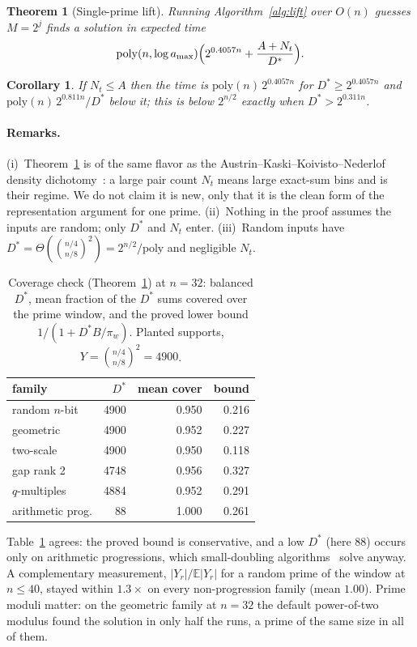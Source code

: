 \documentclass[conference]{IEEEtran}
\newtheorem{theorem}{Theorem}
\newtheorem{corollary}{Corollary}
\begin{document}
\begin{theorem}[Single-prime lift]\label{thm:lift}
Running Algorithm~\ref{alg:lift} over $O(n)$ guesses $M=2^j$ finds a solution in
expected time
\[
\mathrm{poly}(n,\log a_{\max})\Bigl(2^{0.4057n}+\frac{A+N_t}{D^*}\Bigr).
\]
\end{theorem}

\begin{corollary}\label{cor:lift}
If $N_t\le A$ then the time is $\mathrm{poly}(n)\,2^{0.4057n}$ for
$D^*\ge 2^{0.4057n}$ and $\mathrm{poly}(n)\,2^{0.811n}/D^*$ below it; this is below
$2^{n/2}$ exactly when $D^*>2^{0.311n}$.
\end{corollary}

\paragraph*{Remarks.}
(i)~Theorem~\ref{thm:lift} is of the same flavor as the Austrin--Kaski--Koivisto--Nederlof
density dichotomy~\cite{akkn}: a large pair count $N_t$ means large exact-sum bins
and is their regime. We do not claim it is new, only that it is the clean form of
the representation argument for one prime. (ii)~Nothing in the proof assumes the
inputs are random; only $D^*$ and $N_t$ enter. (iii)~Random inputs have
$D^*=\Theta(\binom{n/4}{n/8}^2)=2^{n/2}/\mathrm{poly}$ and negligible $N_t$.

\begin{table}[t]
\centering
\caption{Coverage check (Theorem~\ref{thm:lift}) at $n=32$: balanced
$D^*$, mean fraction of the $D^*$ sums covered over the prime window, and the proved
lower bound $1/(1+D^*B/\pi_w)$. Planted supports, $Y=\binom{n/4}{n/8}^2=4900$.}
\label{tab:lift}
\begin{tabular}{lrrr}
\toprule
family & $D^*$ & mean cover & bound\\
\midrule
random $n$-bit & 4900 & 0.950 & 0.216\\
geometric & 4900 & 0.952 & 0.227\\
two-scale & 4900 & 0.950 & 0.118\\
gap rank 2 & 4748 & 0.956 & 0.327\\
$q$-multiples & 4884 & 0.952 & 0.291\\
arithmetic prog. & 88 & 1.000 & 0.261\\
\bottomrule
\end{tabular}
\end{table}

Table~\ref{tab:lift} agrees: the proved bound is conservative, and a low $D^*$
(here $88$) occurs only on arithmetic progressions, which small-doubling
algorithms~\cite{rwdoubling} solve anyway. A complementary measurement,
$|Y_r|/\mathbb E|Y_r|$ for a random prime of the window at $n\le40$, stayed within
$1.3\times$ on every non-progression family (mean $1.00$). Prime moduli matter:
on the geometric family at $n=32$ the default power-of-two modulus found the
solution in only half the runs, a prime of the same size in all of them.
\end{document}

